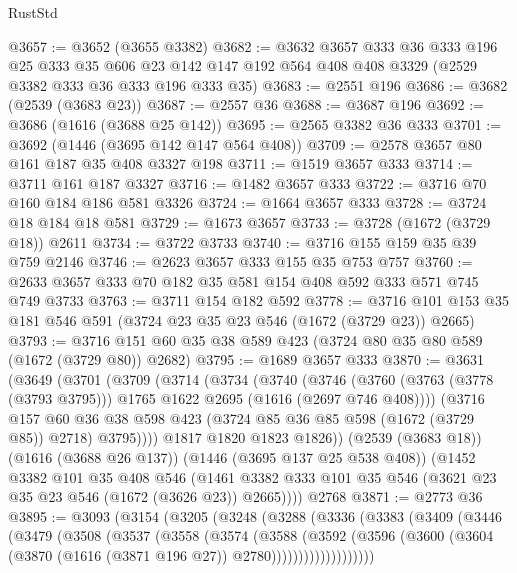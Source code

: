 \begin{lexlean}{RustStd}
\begin{coremodule}
{\begin{coremodule}
{{{{{{{{{{{@3657 := @3652 (@3655 @3382)
@3682 := @3632
    @3657
    @333
    @36
    @333
    @196
    @25
    @333
    @35
    @606
    @23
    @142
    @147
    @192
    @564
    @408
    @408
    @3329
    (@2529 @3382 @333 @36 @333 @196 @333 @35)
@3683 := @2551 @196
@3686 := @3682 (@2539 (@3683 @23))
@3687 := @2557 @36
@3688 := @3687 @196
@3692 := @3686 (@1616 (@3688 @25 @142))
@3695 := @2565 @3382 @36 @333
@3701 := @3692 (@1446 (@3695 @142 @147 @564 @408))
@3709 := @2578 @3657 @80 @161 @187 @35 @408 @3327 @198
@3711 := @1519 @3657 @333
@3714 := @3711 @161 @187 @3327
@3716 := @1482 @3657 @333
@3722 := @3716 @70 @160 @184 @186 @581 @3326
@3724 := @1664 @3657 @333
@3728 := @3724 @18 @184 @18 @581
@3729 := @1673 @3657
@3733 := @3728 (@1672 (@3729 @18)) @2611
@3734 := @3722 @3733
@3740 := @3716 @155 @159 @35 @39 @759 @2146
@3746 := @2623 @3657 @333 @155 @35 @753 @757
@3760 := @2633 @3657 @333 @70 @182 @35 @581 @154 @408 @592 @333 @571 @745 @749 @3733
@3763 := @3711 @154 @182 @592
@3778 := @3716 @101 @153 @35 @181 @546 @591 (@3724 @23 @35 @23 @546 (@1672 (@3729 @23)) @2665)
@3793 := @3716 @151 @60 @35 @38 @589 @423 (@3724 @80 @35 @80 @589 (@1672 (@3729 @80)) @2682)
@3795 := @1689 @3657 @333
@3870 := @3631
    (@3649
      (@3701
        (@3709
          (@3714
            (@3734
              (@3740
                (@3746
                  (@3760 (@3763 (@3778 (@3793 @3795))) @1765 @1622 @2695 (@1616 (@2697 @746 @408))))
                (@3716
                  @157
                  @60
                  @36
                  @38
                  @598
                  @423
                  (@3724 @85 @36 @85 @598 (@1672 (@3729 @85)) @2718)
                  @3795))))
          @1817
          @1820
          @1823
          @1826))
      (@2539 (@3683 @18))
      (@1616 (@3688 @26 @137))
      (@1446 (@3695 @137 @25 @538 @408))
      (@1452
        @3382
        @101
        @35
        @408
        @546
        (@1461 @3382 @333 @101 @35 @546 (@3621 @23 @35 @23 @546 (@1672 (@3626 @23)) @2665))))
    @2768
@3871 := @2773 @36
@3895 := @3093
    (@3154
      (@3205
        (@3248
          (@3288
            (@3336
              (@3383
                (@3409
                  (@3446
                    (@3479
                      (@3508
                        (@3537
                          (@3558
                            (@3574
                              (@3588
                                (@3592
                                  (@3596
                                    (@3600
                                      (@3604
                                        (@3870 (@1616 (@3871 @196 @27)) @2780)))))))))))))))))))
}}}}}}}}}}}
\end{coremodule}}
\end{coremodule}
\end{lexlean}
